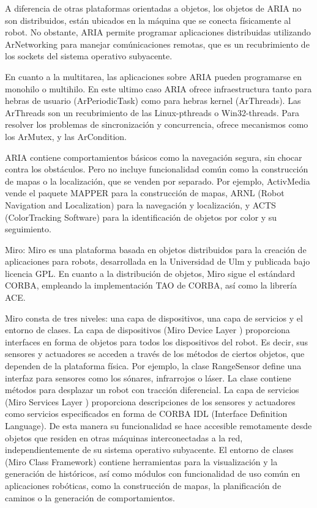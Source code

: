 \begin{itemize}
	A diferencia de otras plataformas orientadas a objetos, los objetos de ARIA no son distribuidos, están ubicados en la máquina que se conecta físicamente al robot. No obstante, ARIA permite programar aplicaciones distribuidas utilizando ArNetworking para manejar comúnicaciones remotas, que es un recubrimiento de los sockets del sistema operativo subyacente.

	En cuanto a la multitarea, las aplicaciones sobre ARIA pueden programarse en monohilo o multihilo. En este ultimo caso ARIA ofrece infraestructura tanto para hebras de usuario (ArPeriodicTask) como para hebras kernel (ArThreads). Las ArThreads son un recubrimiento de las Linux-pthreads o Win32-threads. Para resolver los problemas de sincronización y concurrencia, ofrece mecanismos como los ArMutex, y las ArCondition.

	ARIA contiene comportamientos básicos como la navegación segura, sin chocar contra los obstáculos. Pero no incluye funcionalidad común como la construcción de mapas o la localización, que se venden por separado. Por ejemplo, ActivMedia vende el paquete MAPPER para la construcción de mapas, ARNL (Robot Navigation and Localization) para la navegación y localización, y ACTS (ColorTracking Software) para la identificación de objetos por color y su seguimiento. 

	Miro: Miro es una plataforma basada en objetos distribuidos para la creación de aplicaciones para robots, desarrollada en la Universidad de Ulm y publicada bajo licencia GPL. En cuanto a la distribución de objetos, Miro sigue el estándard CORBA, empleando la implementación TAO de CORBA, así como la librería ACE.

	Miro consta de tres niveles: una capa de dispositivos, una capa de servicios y el entorno de clases. La capa de dispositivos (Miro Device Layer ) proporciona interfaces en forma de objetos para todos los dispositivos del robot. Es decir, sus sensores y actuadores se acceden a través de los métodos de ciertos objetos, que dependen de la plataforma física. Por ejemplo, la clase RangeSensor define una interfaz para sensores como los sónares, infrarrojos o láser. La clase contiene métodos para desplazar un robot con tracción diferencial. La capa de servicios (Miro Services Layer ) proporciona descripciones de los sensores y actuadores como servicios especificados en forma de CORBA IDL (Interface Definition Language). De esta manera su funcionalidad se hace accesible remotamente desde objetos que residen en otras máquinas interconectadas a la red, independientemente de su sistema operativo subyacente. El entorno de clases (Miro Class Framework) contiene herramientas para la visualización y la generación de históricos, así como módulos con funcionalidad de uso común en aplicaciones robóticas, como la construcción de mapas, la planificación de caminos o la generación de comportamientos.


\end{itemize}
